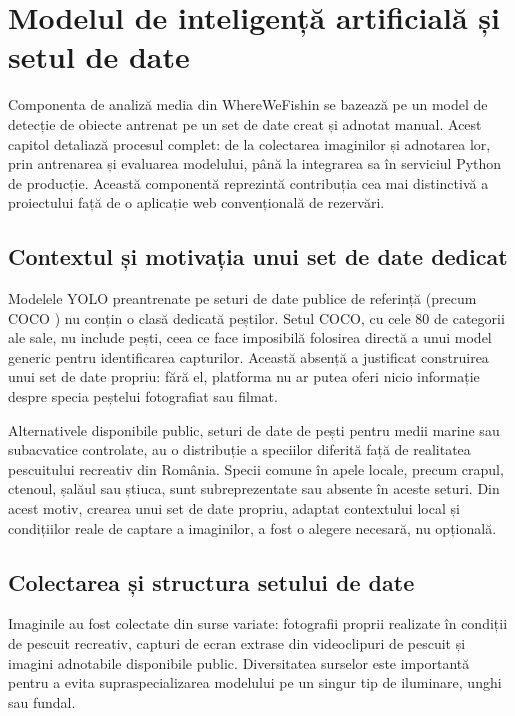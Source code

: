 ﻿\chapter{Modelul de inteligență artificială și setul de date}

Componenta de analiză media din WhereWeFishin se bazează pe un model de detecție de obiecte antrenat pe un set de date creat și adnotat manual. Acest capitol detaliază procesul complet: de la colectarea imaginilor și adnotarea lor, prin antrenarea și evaluarea modelului, până la integrarea sa în serviciul Python de producție. Această componentă reprezintă contribuția cea mai distinctivă a proiectului față de o aplicație web convențională de rezervări.

\section{Contextul și motivația unui set de date dedicat}

Modelele YOLO preantrenate pe seturi de date publice de referință (precum COCO \citep{lin2014coco}) nu conțin o clasă dedicată peștilor. Setul COCO, cu cele 80 de categorii ale sale, nu include pești, ceea ce face imposibilă folosirea directă a unui model generic pentru identificarea capturilor. Această absență a justificat construirea unui set de date propriu: fără el, platforma nu ar putea oferi nicio informație despre specia peștelui fotografiat sau filmat.

Alternativele disponibile public, seturi de date de pești pentru medii marine sau subacvatice controlate, au o distribuție a speciilor diferită față de realitatea pescuitului recreativ din România. Specii comune în apele locale, precum crapul, ctenoul, șalăul sau știuca, sunt subreprezentate sau absente în aceste seturi. Din acest motiv, crearea unui set de date propriu, adaptat contextului local și condițiilor reale de captare a imaginilor, a fost o alegere necesară, nu opțională.

\section{Colectarea și structura setului de date}

Imaginile au fost colectate din surse variate: fotografii proprii realizate în condiții de pescuit recreativ, capturi de ecran extrase din videoclipuri de pescuit și imagini adnotabile disponibile public. Diversitatea surselor este importantă pentru a evita supraspecializarea modelului pe un singur tip de iluminare, unghi sau fundal.

